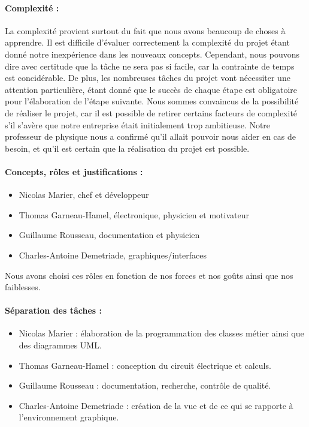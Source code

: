 \paragraph{Complexité :}
La complexité provient surtout du fait que nous avons beaucoup de choses à apprendre.
Il est difficile d'évaluer correctement la complexité du projet étant donné notre inexpérience dans les nouveaux concepts.
Cependant, nous pouvons dire avec certitude que la tâche ne sera pas si facile, car la contrainte de temps est concidérable.
De plus, les nombreuses tâches du projet vont nécessiter une attention particulière, étant donné que le succès de chaque étape est obligatoire pour l'élaboration de l'étape suivante.
Nous sommes convaincus de la possibilité de réaliser le projet, car il est possible de retirer certains facteurs de complexité s'il s'avère que notre entreprise était initialement trop ambitieuse.
Notre professeur de physique nous a confirmé qu'il allait pouvoir nous aider en cas de besoin, et qu'il est certain que la réalisation du projet est possible.

\paragraph{Concepts, rôles et justifications : }
\begin{itemize}
    \item Nicolas Marier, chef et développeur
    \item Thomas Garneau-Hamel, électronique, physicien et motivateur
    \item Guillaume Rousseau, documentation et physicien
    \item Charles-Antoine Demetriade, graphiques/interfaces
\end{itemize}
Nous avons choisi ces rôles en fonction de nos forces et nos goûts ainsi que nos faiblesses.

\paragraph{Séparation des tâches :}
\begin{itemize}
    \item Nicolas Marier : élaboration de la programmation des classes métier ainsi que des diagrammes UML.
    \item Thomas Garneau-Hamel : conception du circuit électrique et calculs.
    \item Guillaume Rousseau : documentation, recherche, contrôle de qualité.
    \item Charles-Antoine Demetriade : création de la vue et de ce qui se rapporte à l'environnement graphique.
\end{itemize}

